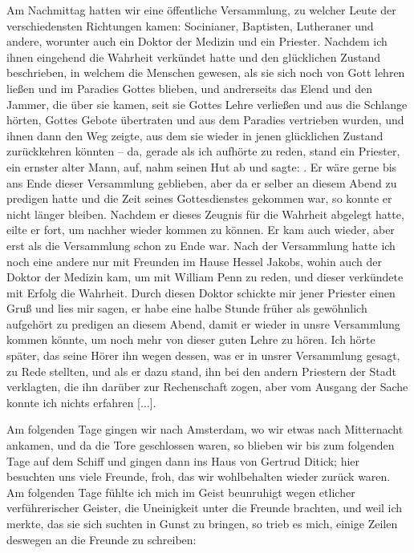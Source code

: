 Am Nachmittag hatten wir eine öffentliche Versammlung,
zu welcher Leute der verschiedensten Richtungen kamen: 
Socinianer, Baptisten, 
Lutheraner und andere, worunter auch ein Doktor der
Medizin und ein Priester. Nachdem ich ihnen eingehend die
Wahrheit verkündet hatte und den glücklichen Zustand beschrieben,
in welchem die Menschen gewesen, als sie sich noch von Gott
lehren ließen und im Paradies Gottes blieben, und andrerseits
das Elend und den Jammer, die über sie kamen, seit sie Gottes
Lehre verließen und aus die Schlange hörten, Gottes Gebote 
übertraten und aus dem Paradies vertrieben wurden, und ihnen dann
den Weg zeigte, aus dem sie wieder in jenen glücklichen Zustand
zurückkehren könnten -- da, gerade als ich aufhörte zu reden,
stand ein Priester, ein ernster alter Mann, auf, nahm seinen Hut
ab und sagte: .
Er wäre gerne bis ans Ende dieser Versammlung geblieben, aber
da er selber an diesem Abend zu predigen hatte und die Zeit
seines Gottesdienstes gekommen war, so konnte er nicht länger
bleiben. Nachdem er dieses Zeugnis für die Wahrheit abgelegt
hatte, eilte er fort, um nachher wieder kommen zu können. Er
kam auch wieder, aber erst als die Versammlung schon zu Ende
war. Nach der Versammlung hatte ich noch eine andere nur mit
Freunden im Hause Hessel Jakobs, 
wohin auch der Doktor der
Medizin kam, um mit William Penn zu reden, 
und dieser verkündete mit Erfolg die Wahrheit. Durch diesen Doktor schickte
mir jener Priester einen Gruß und lies mir sagen, er habe eine
halbe Stunde früher als gewöhnlich aufgehört zu predigen an
diesem Abend, damit er wieder in unsre Versammlung kommen
könnte, um noch mehr von dieser guten Lehre zu hören.
Ich hörte später, das seine Hörer ihn wegen dessen, was er
in unsrer Versammlung gesagt, zu Rede stellten, und als er dazu
stand, ihn bei den andern Priestern der Stadt verklagten, die ihn
darüber zur Rechenschaft zogen, aber vom Ausgang der Sache
konnte ich nichts erfahren [...].

Am folgenden Tage gingen wir nach Amsterdam, wo wir
etwas nach Mitternacht ankamen, und da die Tore geschlossen
waren, so blieben wir bis zum folgenden Tage auf dem Schiff
und gingen dann ins Haus von Gertrud Ditick; hier besuchten
uns viele Freunde, froh, das wir wohlbehalten wieder zurück
waren. Am folgenden Tage fühlte ich mich im Geist beunruhigt
wegen etlicher verführerischer Geister, die Uneinigkeit unter die
Freunde brachten, und weil ich merkte, das sie sich suchten in Gunst
zu bringen, so trieb es mich, einige Zeilen deswegen an die
Freunde zu schreiben: 

